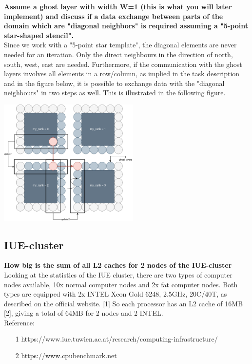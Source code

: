 \documentclass[10pt,a4paper]{article}
\begin{document}
\textbf{Assume a ghost layer with width W=1 (this is what you will later implement) 
and discuss if a data exchange between parts of the domain which are "diagonal neighbors" is 
required assuming a "5-point star-shaped stencil".} \\

Since we work with a "5-point star template", the diagonal elements are never needed for an iteration. Only the 
direct neighbours in the direction of north, south, west, east are needed. Furthermore, if the communication with 
the ghost layers involves all elements in a row/column, as implied in the task description and in the figure below, 
it is possible to exchange data with the "diagonal neighbours" in two steps as well. This is illustrated in the 
following figure. \\


\begin{center}
\includegraphics[width=7cm]{images/Diagonal.png}
\end{center}

\subsection{IUE-cluster}
\textbf{How big is the sum of all L2 caches for 2 nodes of the IUE-cluster }\\


Looking at the statistics of the IUE cluster, there are two types of computer nodes available, 10x normal 
computer nodes and 2x fat computer nodes. Both types are equipped with 2x INTEL Xeon Gold 6248, 2.5GHz, 20C/40T, 
as described on the official website. [1] So each processor has an L2 cache of 16MB [2], giving a total of 64MB 
for 2 nodes and 2 INTEL. \\


Reference:
\begin{enumerate}
    \item [1] https://www.iue.tuwien.ac.at/research/computing-infrastructure/
    \item [2] https://www.cpubenchmark.net
\end{enumerate}
\end{document}
